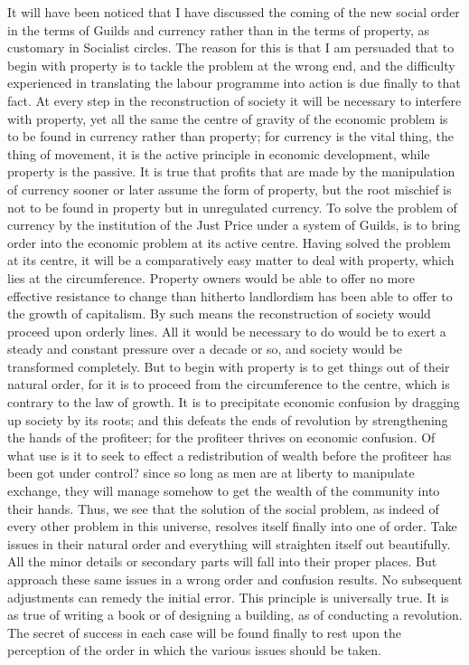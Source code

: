\documentclass{book}
\begin{document}
It will have been noticed that I have discussed the coming of the new social order in the terms of Guilds and currency rather than in the terms of property, as customary in Socialist circles. The reason for this is that I am persuaded that to begin with property is to tackle the problem at the wrong end, and the difficulty experienced in translating the labour programme into action is due finally to that fact. At every step in the reconstruction of society it will be necessary to interfere with property, yet all the same the centre of gravity of the economic problem is to be found in currency rather than property; for currency is the vital thing, the thing of movement, it is the active principle in economic development, while property is the passive. It is true that profits that are made by the manipulation of currency sooner or later assume the form of property, but the root mischief is not to be found in property but in unregulated currency. To solve the problem of currency by the institution of the Just Price under a system of Guilds, is to bring order into the economic problem at its active centre. Having solved the problem at its centre, it will be a comparatively easy matter to deal with property, which lies at the circumference. Property owners would be able to offer no more effective resistance to change than hitherto landlordism has been able to offer to the growth of capitalism. By such means the reconstruction of society would proceed upon orderly lines. All it would be necessary to do would be to exert a steady and constant pressure over a decade or so, and society would be transformed completely. But to begin with property is to get things out of their natural order, for it is to proceed from the circumference to the centre, which is contrary to the law of growth. It is to precipitate economic confusion by dragging up society by its roots; and this defeats the ends of revolution by strengthening the hands of the profiteer; for the profiteer thrives on economic confusion. Of what use is it to seek to effect a redistribution of wealth before the profiteer has been got under control? since so long as men are at liberty to manipulate exchange, they will manage somehow to get the wealth of the community into their hands. Thus, we see that the solution of the social problem, as indeed of every other problem in this universe, resolves itself finally into one of order. Take issues in their natural order and everything will straighten itself out beautifully. All the minor details or secondary parts will fall into their proper places. But approach these same issues in a wrong order and confusion results. No subsequent adjustments can remedy the initial error. This principle is universally true. It is as true of writing a book or of designing a building, as of conducting a revolution. The secret of success in each case will be found finally to rest upon the perception of the order in which the various issues should be taken.
\end{document}
